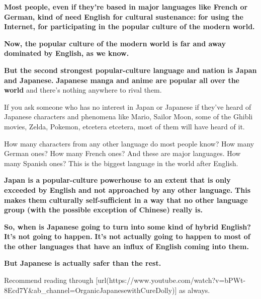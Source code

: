 {\bf Most people, even if they're based in major languages like French or German, kind of need English for cultural sustenance:} {\bf for using the Internet, for participating in the popular culture of the modern world.}

\thinrule

{\bf Now, the popular culture of the modern world is far and away dominated by English, as we know.}

{\bf But the second strongest popular-culture language and nation is Japan and Japanese.} {\bf Japanese manga and anime are popular all over the world} and there's nothing anywhere to rival them.

{}

If you ask someone who has no interest in Japan or Japanese if they've heard of Japanese characters and phenomena like Mario, Sailor Moon, some of the Ghibli movies, Zelda, Pokemon, etcetera etcetera, most of them will have heard of it.

How many characters from any other language do most people know? How many German ones? How many French ones? And these are major languages. How many Spanish ones? This is the biggest language in the world after English.

{\bf Japan is a popular-culture powerhouse to an extent that is only exceeded by English and not approached by any other language.} {\bf This makes them culturally self-sufficient in a way that no other language group (with the possible exception of Chinese) really is.}

\thinrule

{\bf So, when is Japanese going to turn into some kind of hybrid English?} {\bf It's not going to happen.} {\bf It's not actually going to happen to most of the other languages that have an influx of English coming into them.}

{\bf But Japanese is actually safer than the rest.}

Recommend reading through [url(https://www.youtube.com/watch?v=bPWt-8Ecd7Y&ab_channel=OrganicJapanesewithCureDolly)] as always.

{}

{}

\stopsectionlevel

\stopsectionlevel

